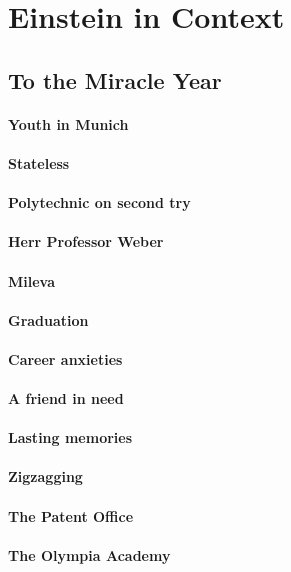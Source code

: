 \documentclass[pagesize,headsepline,10pt,parskip=half]{scrreprt}
\begin{document}
    \clearpage
    \section{Einstein in Context}
      \subsection{To the Miracle Year}
        \paragraph{Youth in Munich}
        \paragraph{Stateless}
        \paragraph{Polytechnic on second try}
        \paragraph{Herr Professor Weber}
        \paragraph{Mileva}
        \paragraph{Graduation}
        \paragraph{Career anxieties}
        \paragraph{A friend in need}
        \paragraph{Lasting memories}
        \paragraph{Zigzagging}
        \paragraph{The Patent Office}
        \paragraph{The Olympia Academy}
\end{document}
